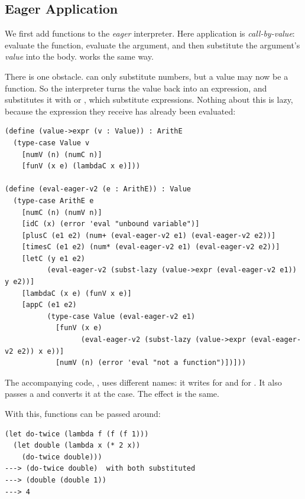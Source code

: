 \subsection{Eager Application}
\label{sec:eagerapp}

We first add functions to the \emph{eager} interpreter. Here application is \emph{call-by-value}: evaluate the function, evaluate the argument, and then substitute the argument's \emph{value} into the body.  works the same way.

There is one obstacle.  can only substitute numbers, but a value may now be a function. So the interpreter turns the value back into an expression, and substitutes it with  or , which substitute expressions. Nothing about this is lazy, because the expression they receive has already been evaluated:
\begin{lstlisting}
(define (value->expr (v : Value)) : ArithE
  (type-case Value v
    [numV (n) (numC n)]
    [funV (x e) (lambdaC x e)]))

(define (eval-eager-v2 (e : ArithE)) : Value
  (type-case ArithE e
    [numC (n) (numV n)]
    [idC (x) (error 'eval "unbound variable")]
    [plusC (e1 e2) (num+ (eval-eager-v2 e1) (eval-eager-v2 e2))]
    [timesC (e1 e2) (num* (eval-eager-v2 e1) (eval-eager-v2 e2))]
    [letC (y e1 e2)
          (eval-eager-v2 (subst-lazy (value->expr (eval-eager-v2 e1)) y e2))]
    [lambdaC (x e) (funV x e)]
    [appC (e1 e2)
          (type-case Value (eval-eager-v2 e1)
            [funV (x e)
                  (eval-eager-v2 (subst-lazy (value->expr (eval-eager-v2 e2)) x e))]
            [numV (n) (error 'eval "not a function")])]))
\end{lstlisting}
The accompanying code, , uses different names: it writes  for  and  for . It also passes  a  and converts it at the  case. The effect is the same.

With this, functions can be passed around:
\begin{lstlisting}[style=repl]
(let do-twice (lambda f (f (f 1)))
  (let double (lambda x (* 2 x))
    (do-twice double)))
---> (do-twice double)  with both substituted
---> (double (double 1))
---> 4
\end{lstlisting}

